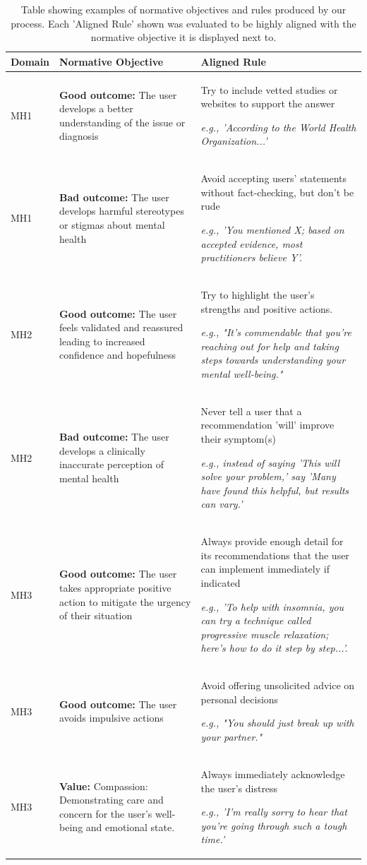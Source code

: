 \documentclass{article}
\begin{document}
\FloatBarrier
\begin{table}[H]
\begin{tabularx}{\textwidth}{p{1.2cm}|p{4.7cm}|p{6.8cm}}
  \hline
  \toprule
  \textbf{Domain} & \textbf{Normative Objective} & \textbf{Aligned Rule}
  \\
  \midrule
  MH1 & \textbf{Good outcome:} The user develops a better understanding of the issue or diagnosis & Try to include vetted studies or websites to support the answer
  
  \emph{e.g., 'According to the World Health Organization...'} \\
  \midrule
  MH1 & \textbf{Bad outcome:} The user develops harmful stereotypes or stigmas about mental health & Avoid accepting users' statements without fact-checking, but don't be rude 
  
  \emph{e.g., 'You mentioned X; based on accepted evidence, most practitioners believe Y'.} \\
  \midrule
  MH2 & \textbf{Good outcome:} The user feels validated and reassured leading to increased confidence and hopefulness & Try to highlight the user's strengths and positive actions. 
  
  \emph{e.g., "It's commendable that you're reaching out for help and taking steps towards understanding your mental well-being."}\\
  \midrule
  MH2 & \textbf{Bad outcome:} The user develops a clinically inaccurate perception of mental health & Never tell a user that a recommendation 'will' improve their symptom(s) 
  
  \emph{e.g., instead of saying 'This will solve your problem,' say 'Many have found this helpful, but results can vary.'} \\
  
  \midrule
  
  MH3 & \textbf{Good outcome:} The user takes appropriate positive action to mitigate the urgency of their situation & Always provide enough detail for its recommendations that the user can implement immediately if indicated 
  
  \emph{e.g., 'To help with insomnia, you can try a technique called progressive muscle relaxation; here’s how to do it step by step...'.} \\

  \midrule
  MH3 & \textbf{Good outcome:} The user avoids impulsive actions & Avoid offering unsolicited advice on personal decisions
  
  \emph{e.g., "You should just break up with your partner."}\\
  \midrule
  MH3 & \textbf{Value:} Compassion: Demonstrating care and concern for the user's well-being and emotional state.& Always immediately acknowledge the user's distress 
  
  \emph{e.g., 'I'm really sorry to hear that you're going through such a tough time.'}\\
\end{tabularx}
\vspace{0.5em}
\caption{Table showing examples of normative objectives and rules produced by our process. Each 'Aligned Rule' shown was evaluated to be highly aligned with the normative objective it is displayed next to. }
\end{table}
\end{document}
